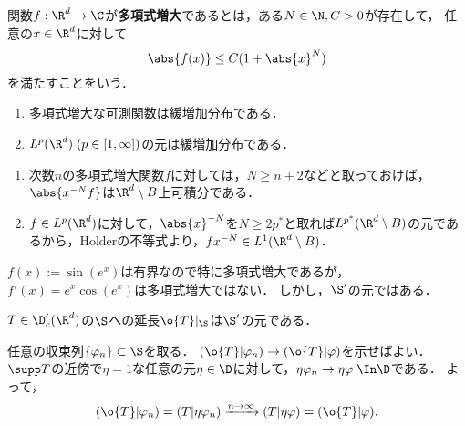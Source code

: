\documentclass[uplatex,dvipdfmx]{jsreport}
\begin{document}
\begin{definition}
    関数$f:\R^d\to\C$が\textbf{多項式増大}であるとは，ある$N\in\N,C>0$が存在して，
    任意の$x\in\R^d$に対して
    \[\abs{f(x)}\le C(1+\abs{x}^N)\]
    を満たすことをいう．
\end{definition}

\begin{corollary}[緩増加分布の重要なクラス2つ]\mbox{}
    \begin{enumerate}
        \item 多項式増大な可測関数は緩増加分布である．
        \item $L^p(\R^d)\;(p\in[1,\infty])$の元は緩増加分布である．
    \end{enumerate}
\end{corollary}
\begin{Proof}\mbox{}
    \begin{enumerate}
        \item 次数$n$の多項式増大関数$f$に対しては，$N\ge n+2$などと取っておけば，$\abs{x^{-N}f}$は$\R^d\setminus B$上可積分である．
        \item $f\in L^p(\R^d)$に対して，$\abs{x}^{-N}$を$N\ge 2p^*$と取れば$L^{p^*}(\R^d\setminus B)$の元であるから，Holderの不等式より，$fx^{-N}\in L^1(\R^d\setminus B)$．
    \end{enumerate}
\end{Proof}

\begin{example}
    $f(x):=\sin(e^x)$は有界なので特に多項式増大であるが，$f'(x)=e^x\cos(e^x)$は多項式増大ではない．
    しかし，$\S'$の元ではある．
\end{example}

\begin{proposition}[コンパクト台を持つ超関数は緩増加分布]\label{prop-compactly-supported-distribution-is-tempered}
    $T\in\D'_c(\R^d)$の$\S$への延長$\o{T}|_{\S}$は$\S'$の元である．
\end{proposition}
\begin{Proof}
    任意の収束列$\{\varphi_n\}\subset\S$を取る．
    $(\o{T}|\varphi_n)\to(\o{T}|\varphi)$を示せばよい．
    $\supp T$の近傍で$\eta=1$な任意の元$\eta\in\D$に対して，$\eta\varphi_n\to\eta\varphi\;\In\D$である．
    よって，
    \[(\o{T}|\varphi_n)=(T|\eta\varphi_n)\xrightarrow{n\to\infty}(T|\eta\varphi)=(\o{T}|\varphi).\]
\end{Proof}
\end{document}
